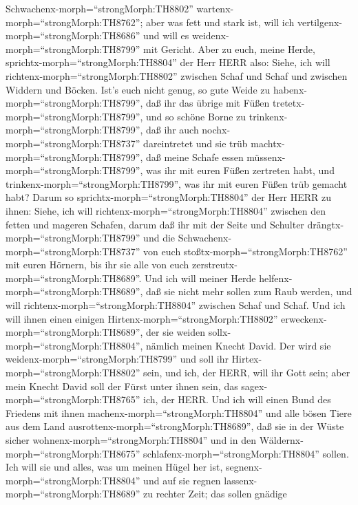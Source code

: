 Schwachenx-morph=``strongMorph:TH8802''
wartenx-morph=``strongMorph:TH8762''; aber was fett und stark ist, will
ich vertilgenx-morph=``strongMorph:TH8686'' und will es
weidenx-morph=``strongMorph:TH8799'' mit Gericht.  Aber zu
euch, meine Herde, sprichtx-morph=``strongMorph:TH8804'' der Herr HERR
also: Siehe, ich will richtenx-morph=``strongMorph:TH8802'' zwischen
Schaf und Schaf und zwischen Widdern und Böcken.  Ist's
euch nicht genug, so gute Weide zu habenx-morph=``strongMorph:TH8799'',
daß ihr das übrige mit Füßen tretetx-morph=``strongMorph:TH8799'', und
so schöne Borne zu trinkenx-morph=``strongMorph:TH8799'', daß ihr auch
nochx-morph=``strongMorph:TH8737'' dareintretet und sie trüb
machtx-morph=``strongMorph:TH8799'',  daß meine Schafe
essen müssenx-morph=``strongMorph:TH8799'', was ihr mit euren Füßen
zertreten habt, und trinkenx-morph=``strongMorph:TH8799'', was ihr mit
euren Füßen trüb gemacht habt?  Darum so
sprichtx-morph=``strongMorph:TH8804'' der Herr HERR zu ihnen: Siehe, ich
will richtenx-morph=``strongMorph:TH8804'' zwischen den fetten und
mageren Schafen,  darum daß ihr mit der Seite und Schulter
drängtx-morph=``strongMorph:TH8799'' und die
Schwachenx-morph=``strongMorph:TH8737'' von euch
stoßtx-morph=``strongMorph:TH8762'' mit euren Hörnern, bis ihr sie alle
von euch zerstreutx-morph=``strongMorph:TH8689''.  Und ich
will meiner Herde helfenx-morph=``strongMorph:TH8689'', daß sie nicht
mehr sollen zum Raub werden, und will
richtenx-morph=``strongMorph:TH8804'' zwischen Schaf und Schaf.
 Und ich will ihnen einen einigen
Hirtenx-morph=``strongMorph:TH8802''
erweckenx-morph=``strongMorph:TH8689'', der sie weiden
sollx-morph=``strongMorph:TH8804'', nämlich meinen Knecht David. Der
wird sie weidenx-morph=``strongMorph:TH8799'' und soll ihr
Hirtex-morph=``strongMorph:TH8802'' sein,  und ich, der
HERR, will ihr Gott sein; aber mein Knecht David soll der Fürst unter
ihnen sein, das sagex-morph=``strongMorph:TH8765'' ich, der HERR.
 Und ich will einen Bund des Friedens mit ihnen
machenx-morph=``strongMorph:TH8804'' und alle bösen Tiere aus dem Land
ausrottenx-morph=``strongMorph:TH8689'', daß sie in der Wüste sicher
wohnenx-morph=``strongMorph:TH8804'' und in den
Wäldernx-morph=``strongMorph:TH8675''
schlafenx-morph=``strongMorph:TH8804'' sollen.  Ich will
sie und alles, was um meinen Hügel her ist,
segnenx-morph=``strongMorph:TH8804'' und auf sie regnen
lassenx-morph=``strongMorph:TH8689'' zu rechter Zeit; das sollen gnädige
